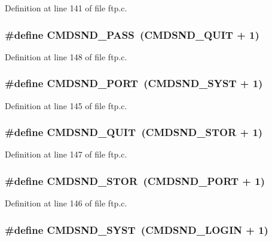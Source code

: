 Definition at line 141 of file ftp.c.

\hypertarget{group__ftp_gad963fe7e365e51c13a39021a072514dc}{
\subsubsection[{CMDSND\_\-PASS}]{\setlength{\rightskip}{0pt plus 5cm}\#define CMDSND\_\-PASS~(CMDSND\_\-QUIT + 1)}}
\label{group__ftp_gad963fe7e365e51c13a39021a072514dc}


Definition at line 148 of file ftp.c.

\hypertarget{group__ftp_ga5fd7323ffea47577521123adcc300ad6}{
\subsubsection[{CMDSND\_\-PORT}]{\setlength{\rightskip}{0pt plus 5cm}\#define CMDSND\_\-PORT~(CMDSND\_\-SYST + 1)}}
\label{group__ftp_ga5fd7323ffea47577521123adcc300ad6}


Definition at line 145 of file ftp.c.

\hypertarget{group__ftp_ga331a32428d69dbedae488b9628ca4d8f}{
\subsubsection[{CMDSND\_\-QUIT}]{\setlength{\rightskip}{0pt plus 5cm}\#define CMDSND\_\-QUIT~(CMDSND\_\-STOR + 1)}}
\label{group__ftp_ga331a32428d69dbedae488b9628ca4d8f}


Definition at line 147 of file ftp.c.

\hypertarget{group__ftp_gaf3f7c0df09046aa2d6c810d3e17344e8}{
\subsubsection[{CMDSND\_\-STOR}]{\setlength{\rightskip}{0pt plus 5cm}\#define CMDSND\_\-STOR~(CMDSND\_\-PORT + 1)}}
\label{group__ftp_gaf3f7c0df09046aa2d6c810d3e17344e8}


Definition at line 146 of file ftp.c.

\hypertarget{group__ftp_gac9eca61747dcd7285f647e74c01bdf74}{
\subsubsection[{CMDSND\_\-SYST}]{\setlength{\rightskip}{0pt plus 5cm}\#define CMDSND\_\-SYST~(CMDSND\_\-LOGIN + 1)}}
\label{group__ftp_gac9eca61747dcd7285f647e74c01bdf74}


